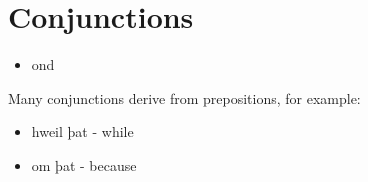 \section{Conjunctions}

\begin{itemize}
\item ond
\end{itemize}

Many conjunctions derive from prepositions, for example:

\begin{itemize}
\item hweil þat - while
\item om þat - because
\end{itemize}
